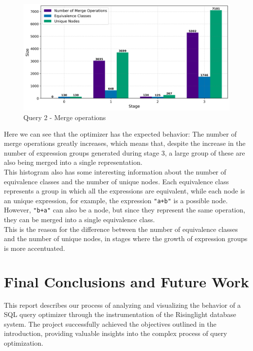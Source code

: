 \documentclass[a4paper,12pt]{scrreprt}
\begin{document}
\begin{figure}[H]
    \centering
    \includegraphics[width=\linewidth]{img_merges/q2_sizes.png}
    \caption{Query 2 - Merge operations}
    \label{fig:hist2}
\end{figure}

Here we can see that the optimizer has the expected behavior: The number of merge operations greatly increases, which means that, despite the increase in the number of expression groups generated during stage 3, a large group of these are also being merged into a single representation. \\

This histogram also has some interesting information about the number of equivalence classes and the number of unique nodes. Each equivalence class represents a group in which all the expressions are equivalent, while each node is an unique expression, for example, the expression \texttt{"a+b"} is a possible node.\\ 
However, \texttt{"b+a"} can also be a node, but since they represent the same operation, they can be merged into a single equivalence class. \\
This is the reason for the difference between the number of equivalence classes and the number of unique nodes, in stages where the growth of expression groups is more accentuated. \\


\chapter{Final Conclusions and Future Work} \label{chap:concl}
\thispagestyle{fancy}
This report describes our process of analyzing and visualizing the behavior of a SQL query optimizer through the instrumentation of the Risinglight database system. The project successfully achieved the objectives outlined in the introduction, providing valuable insights into the complex process of query optimization.
\end{document}
